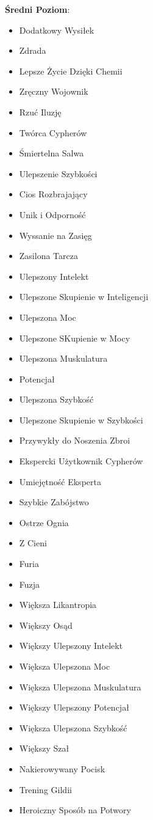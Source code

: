 \textbf{Średni Poziom}:

\begin{itemize}
\item Dodatkowy Wysiłek
\item Zdrada
\item Lepsze Życie Dzięki Chemii
\item Zręczny Wojownik
\item Rzuć Iluzję
\item Twórca Cypherów
\item Śmiertelna Salwa
\item Ulepszenie Szybkości
\item Cios Rozbrajający 
\item Unik i Odporność
\item Wyssanie na Zasięg
\item Zasilona Tarcza
\item Ulepszony Intelekt
\item Ulepszone Skupienie w Inteligencji
\item Ulepszona Moc
\item Ulepszone SKupienie w Mocy
\item Ulepszona Muskulatura
\item Potencjał
\item Ulepszona Szybkość
\item Ulepszone Skupienie w Szybkości
\item Przywykły do Noszenia Zbroi
\item Ekspercki Użytkownik Cypherów
\item Umiejętność Eksperta
\item Szybkie Zabójstwo
\item Ostrze Ognia
\item Z Cieni
\item Furia
\item Fuzja
\item Większa Likantropia
\item Większy Osąd
\item Większy Ulepszony Intelekt
\item Większa Ulepszona Moc
\item Większa Ulepszona Muskulatura
\item Większy Ulepszony Potencjał
\item Większa Ulepszona Szybkość
\item Większy Szał
\item Nakierowywany Pocisk
\item Trening Gildii
\item Heroiczny Sposób na Potwory

\end{itemize}
